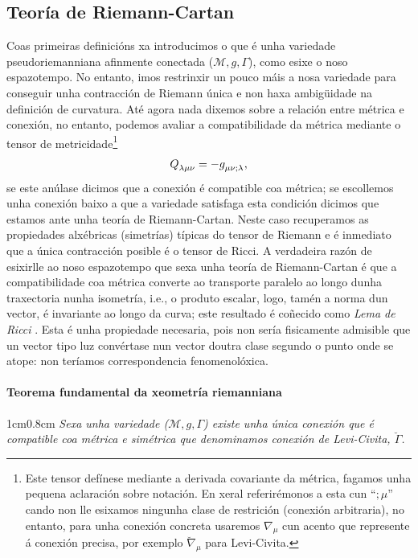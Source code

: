 \subsection{Teoría de Riemann-Cartan}
Coas primeiras definicións xa introducimos o que é unha variedade pseudoriemanniana afinmente conectada ($\mathcal{M},g,\Gamma$), como esixe o noso espazotempo. No entanto, imos restrinxir un pouco máis a nosa variedade para conseguir unha contracción de Riemann única e non haxa ambigüidade na definición de curvatura. Até agora nada dixemos sobre a relación entre métrica e conexión, no entanto, podemos avaliar a compatibilidade da métrica mediante o tensor de metricidade\footnote{Este tensor defínese mediante a derivada covariante da métrica, fagamos unha pequena aclaración sobre notación. En xeral referirémonos a esta cun ``$;\mu$'' cando non lle esixamos ningunha clase de restrición (conexión arbitraria), no entanto, para unha conexión concreta usaremos $\nabla_\mu$ cun acento que represente á conexión precisa, por exemplo $\breve\nabla_\mu$ para Levi-Civita.}
\begin{align}
    Q\indices{_\lambda_\mu_\nu} = -g\indices{_\mu_\nu_{;\lambda}},
\end{align}
se este anúlase dicimos que a conexión é compatible coa métrica; se escollemos unha conexión baixo a que a variedade satisfaga esta condición dicimos que estamos ante unha teoría de Riemann-Cartan. Neste caso recuperamos as propiedades alxébricas (simetrías) típicas do tensor de Riemann e é inmediato que a única contracción posible é o tensor de Ricci. A verdadeira razón de esixirlle ao noso espazotempo que sexa unha teoría de Riemann-Cartan é que a compatibilidade coa métrica converte ao transporte paralelo ao longo dunha traxectoria nunha isometría, i.e., o produto escalar, logo, tamén a norma dun vector, é invariante ao longo da curva; este resultado é coñecido como \textit{Lema de Ricci} \cite{lovelock-1989}. Esta é unha propiedade necesaria, pois non sería fisicamente admisible que un vector tipo luz convértase nun vector doutra clase segundo o punto onde se atope: non teríamos correspondencia fenomenolóxica. 

\paragraph{Teorema fundamental da xeometría riemanniana}
\begin{adjustwidth}{1cm}{0.8cm}
    \textit{Sexa unha variedade ($\mathcal{M},g,\Gamma$) existe unha única conexión que é compatible coa métrica e simétrica que denominamos \textit{conexión de Levi-Civita}, $\breve\Gamma$.} \cite{doCarmo}\vspace{0.4em}
\end{adjustwidth}


